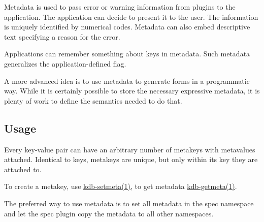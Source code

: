 \begin{DoxyItemize}
\item Metadata is used to pass error or warning information from plugins to the application. The application can decide to present it to the user. The information is uniquely identified by numerical codes. Metadata can also embed descriptive text specifying a reason for the error.
\item Applications can remember something about keys in metadata. Such metadata generalizes the application-\/defined flag.
\item A more advanced idea is to use metadata to generate forms in a programmatic way. While it is certainly possible to store the necessary expressive metadata, it is plenty of work to define the semantics needed to do that.
\end{DoxyItemize}

\subsection*{Usage}

Every key-\/value pair can have an arbitrary number of metakeys with metavalues attached. Identical to keys, metakeys are unique, but only within its key they are attached to.

To create a metakey, use \hyperlink{md_doc_help_kdb-setmeta_doc_help_kdb-setmeta_md}{kdb-\/setmeta(1)}, to get metadata \hyperlink{md_doc_help_kdb-getmeta_doc_help_kdb-getmeta_md}{kdb-\/getmeta(1)}.

The preferred way to use metadata is to set all metadata in the {\ttfamily spec} namespace and let the {\ttfamily spec} plugin copy the metadata to all other namespaces. 